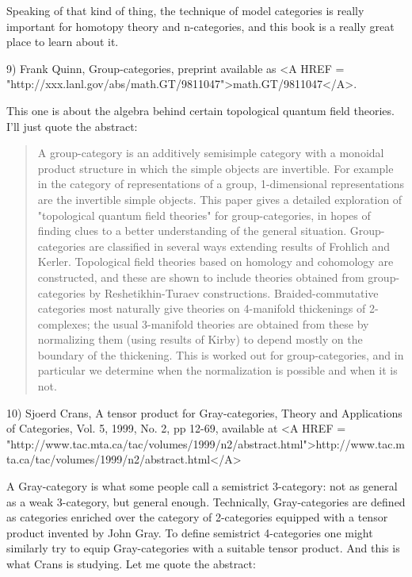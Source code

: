 Speaking of that kind of thing, the technique of model categories is 
really important for homotopy theory and n-categories, and this book
is a really great place to learn about it.  

9) Frank Quinn, Group-categories, preprint available as 
<A HREF = "http://xxx.lanl.gov/abs/math.GT/9811047">math.GT/9811047</A>.

This one is about the algebra behind certain topological quantum field 
theories.  I'll just quote the abstract:

\begin{quote}
     A group-category is an additively semisimple category with a
     monoidal product structure in which the simple objects are
     invertible. For example in the category of representations of a
     group, 1-dimensional representations are the invertible simple
     objects. This paper gives a detailed exploration of "topological
     quantum field theories" for group-categories, in hopes of finding
     clues to a better understanding of the general situation.
     Group-categories are classified in several ways extending results
     of Frohlich and Kerler. Topological field theories based on homology
     and cohomology are constructed, and these are shown to include
     theories obtained from group-categories by Reshetikhin-Turaev
     constructions. Braided-commutative categories most naturally give
     theories on 4-manifold thickenings of 2-complexes; the usual
     3-manifold theories are obtained from these by normalizing them
     (using results of Kirby) to depend mostly on the boundary of the
     thickening. This is worked out for group-categories, and in
     particular we determine when the normalization is possible and when
     it is not.
\end{quote}
10) Sjoerd Crans, A tensor product for Gray-categories, 
Theory and Applications of Categories, Vol. 5, 1999, No. 2, pp 12-69, 
available at <A HREF = "http://www.tac.mta.ca/tac/volumes/1999/n2/abstract.html">http://www.tac.mta.ca/tac/volumes/1999/n2/abstract.html</A>
 
A Gray-category is what some people call a semistrict 3-category: not as
general as a weak 3-category, but general enough.  Technically,
Gray-categories are defined as categories enriched over the category of
2-categories equipped with a tensor product invented by John Gray.  To
define semistrict 4-categories one might similarly try to equip
Gray-categories with a suitable tensor product.  And this is what Crans
is studying.  Let me quote the abstract:

